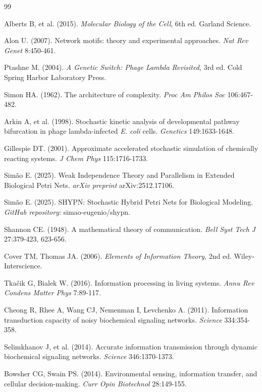 \documentclass[10pt,twocolumn]{article}
\begin{document}
\begin{thebibliography}{99}

Alberts B, et al. (2015). \textit{Molecular Biology of the Cell}, 6th ed. Garland Science.

Alon U. (2007). Network motifs: theory and experimental approaches. \textit{Nat Rev Genet} 8:450-461.

Ptashne M. (2004). \textit{A Genetic Switch: Phage Lambda Revisited}, 3rd ed. Cold Spring Harbor Laboratory Press.

Simon HA. (1962). The architecture of complexity. \textit{Proc Am Philos Soc} 106:467-482.

Arkin A, et al. (1998). Stochastic kinetic analysis of developmental pathway bifurcation in phage lambda-infected \textit{E. coli} cells. \textit{Genetics} 149:1633-1648.

Gillespie DT. (2001). Approximate accelerated stochastic simulation of chemically reacting systems. \textit{J Chem Phys} 115:1716-1733.

Simão E. (2025). Weak Independence Theory and Parallelism in Extended Biological Petri Nets. \textit{arXiv preprint} arXiv:2512.17106.

Simão E. (2025). SHYPN: Stochastic Hybrid Petri Nets for Biological Modeling. \textit{GitHub repository}: simao-eugenio/shypn.

Shannon CE. (1948). A mathematical theory of communication. \textit{Bell Syst Tech J} 27:379-423, 623-656.

Cover TM, Thomas JA. (2006). \textit{Elements of Information Theory}, 2nd ed. Wiley-Interscience.

Tkačik G, Bialek W. (2016). Information processing in living systems. \textit{Annu Rev Condens Matter Phys} 7:89-117.

Cheong R, Rhee A, Wang CJ, Nemenman I, Levchenko A. (2011). Information transduction capacity of noisy biochemical signaling networks. \textit{Science} 334:354-358.

Selimkhanov J, et al. (2014). Accurate information transmission through dynamic biochemical signaling networks. \textit{Science} 346:1370-1373.

Bowsher CG, Swain PS. (2014). Environmental sensing, information transfer, and cellular decision-making. \textit{Curr Opin Biotechnol} 28:149-155.


\end{thebibliography}
\end{document}
